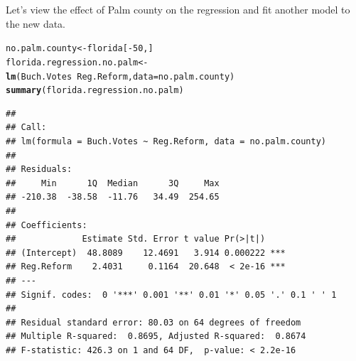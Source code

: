 \documentclass{article}\usepackage[]{graphicx}\usepackage[]{color}
\makeatletter
\newcommand{\hlnum}[1]{\textcolor[rgb]{0.686,0.059,0.569}{#1}}%
\newcommand{\hlopt}[1]{\textcolor[rgb]{0,0,0}{#1}}%
\newcommand{\hlstd}[1]{\textcolor[rgb]{0.345,0.345,0.345}{#1}}%
\newcommand{\hlkwb}[1]{\textcolor[rgb]{0.69,0.353,0.396}{#1}}%
\newcommand{\hlkwc}[1]{\textcolor[rgb]{0.333,0.667,0.333}{#1}}%
\newcommand{\hlkwd}[1]{\textcolor[rgb]{0.737,0.353,0.396}{\textbf{#1}}}%
\newenvironment{kframe}{%
 \def\at@end@of@kframe{}%
 \ifinner\ifhmode%
  \def\at@end@of@kframe{\end{minipage}}%
  \begin{minipage}{\columnwidth}%
 \fi\fi%
 \def\FrameCommand##1{\hskip\@totalleftmargin \hskip-\fboxsep
 \colorbox{shadecolor}{##1}\hskip-\fboxsep
     \hskip-\linewidth \hskip-\@totalleftmargin \hskip\columnwidth}%
 \MakeFramed {\advance\hsize-\width
   \@totalleftmargin\z@ \linewidth\hsize
   \@setminipage}}%
 {\par\unskip\endMakeFramed%
 \at@end@of@kframe}
\newenvironment{knitrout}{}{} %
\makeatother
\begin{document}
Let's view the effect of Palm county on the regression and fit another model to the new data. 


\begin{knitrout}
\color{fgcolor}\begin{kframe}
\begin{alltt}
\hlstd{no.palm.county} \hlkwb{<-} \hlstd{florida[}\hlopt{-}\hlnum{50}\hlstd{, ]}
\hlstd{florida.regression.no.palm} \hlkwb{<-} \hlkwd{lm}\hlstd{(Buch.Votes}\hlopt{~}\hlstd{Reg.Reform,} \hlkwc{data} \hlstd{= no.palm.county)}
\hlkwd{summary}\hlstd{(florida.regression.no.palm)}
\end{alltt}
\begin{verbatim}
## 
## Call:
## lm(formula = Buch.Votes ~ Reg.Reform, data = no.palm.county)
## 
## Residuals:
##     Min      1Q  Median      3Q     Max 
## -210.38  -38.58  -11.76   34.49  254.65 
## 
## Coefficients:
##             Estimate Std. Error t value Pr(>|t|)    
## (Intercept)  48.8089    12.4691   3.914 0.000222 ***
## Reg.Reform    2.4031     0.1164  20.648  < 2e-16 ***
## ---
## Signif. codes:  0 '***' 0.001 '**' 0.01 '*' 0.05 '.' 0.1 ' ' 1
## 
## Residual standard error: 80.03 on 64 degrees of freedom
## Multiple R-squared:  0.8695,	Adjusted R-squared:  0.8674 
## F-statistic: 426.3 on 1 and 64 DF,  p-value: < 2.2e-16
\end{verbatim}
\end{kframe}
\end{knitrout}
\end{document}
